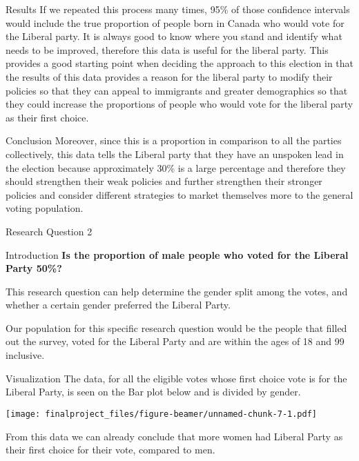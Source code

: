 \documentclass[
  9pt,
  ignorenonframetext,
]{beamer}
\begin{document}
\begin{frame}
\begin{block}{Results}
\protect\hypertarget{results}{}
If we repeated this process many times, 95\% of those confidence
intervals would include the true proportion of people born in Canada who
would vote for the Liberal party. It is always good to know where you
stand and identify what needs to be improved, therefore this data is
useful for the liberal party. This provides a good starting point when
deciding the approach to this election in that the results of this data
provides a reason for the liberal party to modify their policies so that
they can appeal to immigrants and greater demographics so that they
could increase the proportions of people who would vote for the liberal
party as their first choice.
\end{block}

\begin{block}{Conclusion}
\protect\hypertarget{conclusion}{}
Moreover, since this is a proportion in comparison to all the parties
collectively, this data tells the Liberal party that they have an
unspoken lead in the election because approximately 30\% is a large
percentage and therefore they should strengthen their weak policies and
further strengthen their stronger policies and consider different
strategies to market themselves more to the general voting population.
\end{block}
\end{frame}

\begin{frame}{Research Question 2}
\protect\hypertarget{research-question-2}{}
\begin{block}{Introduction}
\protect\hypertarget{introduction-2}{}
\textbf{Is the proportion of male people who voted for the Liberal Party
50\%?}

This research question can help determine the gender split among the
votes, and whether a certain gender preferred the Liberal Party.

Our population for this specific research question would be the people
that filled out the survey, voted for the Liberal Party and are within
the ages of 18 and 99 inclusive.
\end{block}
\end{frame}

\begin{frame}
\begin{block}{Visualization}
\protect\hypertarget{visualization-1}{}
The data, for all the eligible votes whose first choice vote is for the
Liberal Party, is seen on the Bar plot below and is divided by gender.

\texttt{[image: finalproject\_files/figure-beamer/unnamed-chunk-7-1.pdf]}

From this data we can already conclude that more women had Liberal Party
as their first choice for their vote, compared to men.
\end{block}
\end{frame}
\end{document}
